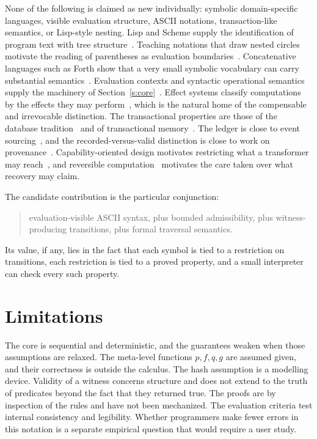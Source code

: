 \documentclass[11pt]{article}
\begin{document}
None of the following is claimed as new individually: symbolic domain-specific languages, visible evaluation structure, ASCII notations, transaction-like semantics, or Lisp-style nesting. Lisp and Scheme supply the identification of program text with tree structure~\cite{sicp}. Teaching notations that draw nested circles motivate the reading of parentheses as evaluation boundaries~\cite{bootstrap}. Concatenative languages such as Forth show that a very small symbolic vocabulary can carry substantial semantics~\cite{forth}. Evaluation contexts and syntactic operational semantics supply the machinery of Section~\ref{s:core}~\cite{felleisen,wright,plotkin}. Effect systems classify computations by the effects they may perform~\cite{gifford}, which is the natural home of the compensable and irrevocable distinction. The transactional properties are those of the database tradition~\cite{haerder} and of transactional memory~\cite{herlihy}. The ledger is close to event sourcing~\cite{fowler}, and the recorded-versus-valid distinction is close to work on provenance~\cite{buneman}. Capability-oriented design motivates restricting what a transformer may reach~\cite{miller}, and reversible computation~\cite{bennett} motivates the care taken over what recovery may claim.

The candidate contribution is the particular conjunction:
\begin{quote}
evaluation-visible ASCII syntax, plus bounded admissibility, plus witness-producing transitions, plus formal traversal semantics.
\end{quote}
Its value, if any, lies in the fact that each symbol is tied to a restriction on transitions, each restriction is tied to a proved property, and a small interpreter can check every such property.

\section{Limitations}

The core is sequential and deterministic, and the guarantees weaken when those assumptions are relaxed. The meta-level functions $p,f,q,g$ are assumed given, and their correctness is outside the calculus. The hash assumption is a modelling device. Validity of a witness concerns structure and does not extend to the truth of predicates beyond the fact that they returned true. The proofs are by inspection of the rules and have not been mechanized. The evaluation criteria test internal consistency and legibility. Whether programmers make fewer errors in this notation is a separate empirical question that would require a user study.
\end{document}

